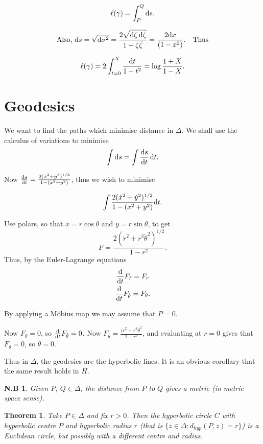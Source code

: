\documentclass{notes}
\theoremstyle{plain}
\newtheorem{theorem}[proposition]{Theorem}
\newtheorem*{notes}{N.B}
\begin{document}
\[
\ell(\gamma) = \int_P^Q \mathrm{d} s.
\]

\[
\text{Also, }\mathrm{d} s = \sqrt{\mathrm{d}\sigma^2} = \frac{2 \sqrt{\mathrm{d}\zeta\, \mathrm{d}\Bar{\zeta}}}{1 -
\zeta\Bar{\zeta}} = \frac{2 \mathrm{d} x}{(1-x^2)}.\quad \text{Thus}
\]

\[
\ell(\gamma) = 2 \int_{t=0}^X \frac{\mathrm{d} t}{1-t^2} = \log \frac{1+X}{1-X}.
\]

\section{Geodesics}

We want to find the paths which minimise distance in $\Delta$.  We shall use
the calculus of variations to minimise
\[
\int \mathrm{d} s = \int \frac{\mathrm{d} s}{\mathrm{d} t}\, \mathrm{d} t.
\]

Now $\frac{\mathrm{d} s}{\mathrm{d} t} = \frac{2(\dot{x}^2 + \dot{y}^2)^{1/2}}{1-( x^2 + y^2)}$,
thus we wish to minimise

\[
\int \frac{2(\dot{x}^2 + \dot{y}^2)^{1/2}}{1-( x^2 + y^2)} \mathrm{d} t.
\]

Use polars, so that $x = r \cos \theta$ and $y = r \sin \theta$, to get
\[
F = \frac{2 (\dot{r}^2 + r^2 \dot{\theta}^2)^{1/2}}{1-r^2}.
\]
Thus, by the Euler-Lagrange equations
\begin{gather*}
\frac{\mathrm{d}}{\mathrm{d} t} F_{\dot{r}} = F_r \\
\frac{\mathrm{d}}{\mathrm{d} t} F_{\dot{\theta}} = F_\theta.
\end{gather*}

By applying a M\"obius map we may assume that $P=0$.

Now $F_\theta = 0$, so $\frac{\mathrm{d}}{\mathrm{d} t} F_{\dot{\theta}} = 0$.  Now
$F_{\dot{\theta}} = \frac{(\dot{r}^2 + r^2 \dot{\theta}^2}{1-r^2}$, and
evaluating at $r = 0$ gives that $F_{\dot{\theta}} = 0$, so $\dot{\theta}=0$.

Thus in $\Delta$, the geodesics are the hyperbolic lines.  It is an obvious
corollary that the same result holds in $H$.

\begin{notes}
Given $P$, $Q \in \Delta$, the distance from $P$ to $Q$ gives a metric
(in metric space sense).
\end{notes}

\begin{theorem}
Take $P \in \Delta$ and fix $r > 0$.  Then the hyperbolic circle $C$
with hyperbolic centre $P$ and hyperbolic radius $r$ 
(that is $\{ z \in \Delta : d_{hyp}(P,z) = r \}$) is a Euclidean circle,
but possibly with a different centre and radius.
\end{theorem}
\end{document}
